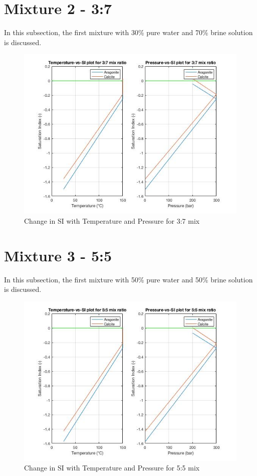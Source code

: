 \section{Mixture 2 - 3:7}
In this subsection, the first mixture with 30\% pure water and 70\% brine solution is discussed. 

\begin{figure}
    \centering
    \includegraphics[scale=0.7]{3-7ratio.jpg}
    \caption{Change in SI with Temperature and Pressure for 3:7 mix }
    \label{fig:3-7}
\end{figure}

\section{Mixture 3 - 5:5}
In this subsection, the first mixture with 50\% pure water and 50\% brine solution is discussed. 

\begin{figure}
    \centering
    \includegraphics[scale=0.7]{5-5ratio.jpg}
    \caption{Change in SI with Temperature and Pressure for 5:5 mix }
    \label{fig:5-5}
\end{figure}




